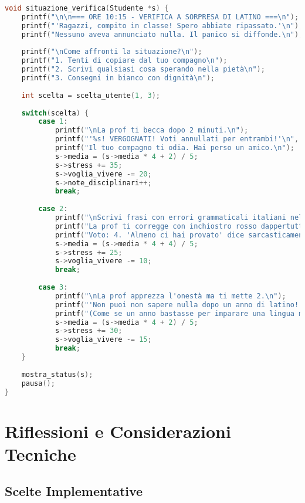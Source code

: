 \documentclass[a4paper,12pt]{article}
\begin{document}
\begin{lstlisting}[language=C, caption=Esempio di situazione di gioco]
void situazione_verifica(Studente *s) {
    printf("\n\n=== ORE 10:15 - VERIFICA A SORPRESA DI LATINO ===\n");
    printf("'Ragazzi, compito in classe! Spero abbiate ripassato.'\n");
    printf("Nessuno aveva annunciato nulla. Il panico si diffonde.\n");
    
    printf("\nCome affronti la situazione?\n");
    printf("1. Tenti di copiare dal tuo compagno\n");
    printf("2. Scrivi qualsiasi cosa sperando nella pietà\n");
    printf("3. Consegni in bianco con dignità\n");
    
    int scelta = scelta_utente(1, 3);
    
    switch(scelta) {
        case 1:
            printf("\nLa prof ti becca dopo 2 minuti.\n");
            printf("'%s! VERGOGNATI! Voti annullati per entrambi!'\n", s->nome);
            printf("Il tuo compagno ti odia. Hai perso un amico.\n");
            s->media = (s->media * 4 + 2) / 5;
            s->stress += 35;
            s->voglia_vivere -= 20;
            s->note_disciplinari++;
            break;
            
        case 2:
            printf("\nScrivi frasi con errori grammaticali italiani nella versione latina.\n");
            printf("La prof ti corregge con inchiostro rosso dappertutto.\n");
            printf("Voto: 4. 'Almeno ci hai provato' dice sarcasticamente.\n");
            s->media = (s->media * 4 + 4) / 5;
            s->stress += 25;
            s->voglia_vivere -= 10;
            break;
            
        case 3:
            printf("\nLa prof apprezza l'onestà ma ti mette 2.\n");
            printf("'Non puoi non sapere nulla dopo un anno di latino!'\n");
            printf("(Come se un anno bastasse per imparare una lingua morta)\n");
            s->media = (s->media * 4 + 2) / 5;
            s->stress += 30;
            s->voglia_vivere -= 15;
            break;
    }
    
    mostra_status(s);
    pausa();
}
\end{lstlisting}

\section{Riflessioni e Considerazioni Tecniche}

\subsection{Scelte Implementative}
\end{document}
